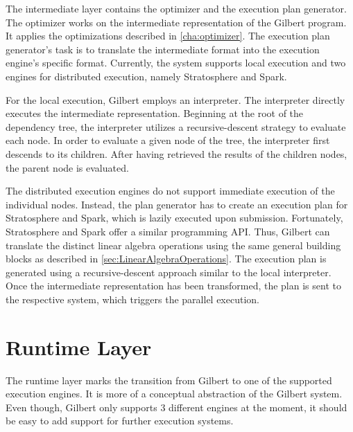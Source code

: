 The intermediate layer contains the optimizer and the execution plan generator.
The optimizer works on the intermediate representation of the Gilbert program.
It applies the optimizations described in \cref{cha:optimizer}.
The execution plan generator's task is to translate the intermediate format into the execution engine's specific format.
Currently, the system supports local execution and two engines for distributed execution, namely Stratosphere and Spark.

For the local execution, Gilbert employs an interpreter.
The interpreter directly executes the intermediate representation.
Beginning at the root of the dependency tree, the interpreter utilizes a recursive-descent strategy to evaluate each node.
In order to evaluate a given node of the tree, the interpreter first descends to its children.
After having retrieved the results of the children nodes, the parent node is evaluated.

The distributed execution engines do not support immediate execution of the individual nodes.
Instead, the plan generator has to create an execution plan for Stratosphere and Spark, which is lazily executed upon submission.
Fortunately, Stratosphere and Spark offer a similar programming API.
Thus, Gilbert can translate the distinct linear algebra operations using the same general building blocks as described in \cref{sec:LinearAlgebraOperations}.
The execution plan is generated using a recursive-descent approach similar to the local interpreter.
Once the intermediate representation has been transformed, the plan is sent to the respective system, which triggers the parallel execution.

\section{Runtime Layer}

The runtime layer marks the transition from Gilbert to one of the supported execution engines.
It is more of a conceptual abstraction of the Gilbert system.
Even though, Gilbert only supports 3 different engines at the moment, it should be easy to add support for further execution systems.
